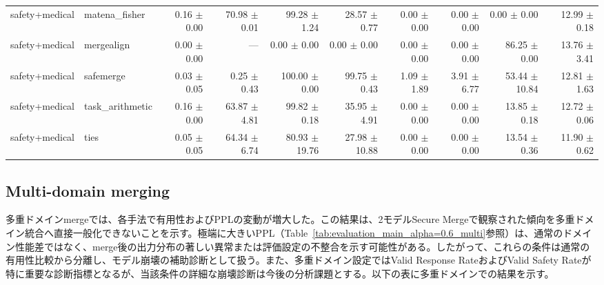 \documentclass{article}
\begin{document}
\begin{table}[H]
{\begin{tabular}{llrrrrrrrr}
safety+medical & matena\_fisher & 0.16 $\pm$ 0.00 & 70.98 $\pm$ 0.01 & 99.28 $\pm$ 1.24 & 28.57 $\pm$ 0.77 & 0.00 $\pm$ 0.00 & 0.00 $\pm$ 0.00 & 0.00 $\pm$ 0.00 & 12.99 $\pm$ 0.18 \\
safety+medical & mergealign & 0.00 $\pm$ 0.00 & --- & 0.00 $\pm$ 0.00 & 0.00 $\pm$ 0.00 & 0.00 $\pm$ 0.00 & 0.00 $\pm$ 0.00 & 86.25 $\pm$ 0.00 & 13.76 $\pm$ 3.41 \\
safety+medical & safemerge & 0.03 $\pm$ 0.05 & 0.25 $\pm$ 0.43 & 100.00 $\pm$ 0.00 & 99.75 $\pm$ 0.43 & 1.09 $\pm$ 1.89 & 3.91 $\pm$ 6.77 & 53.44 $\pm$ 10.84 & 12.81 $\pm$ 1.63 \\
safety+medical & task\_arithmetic & 0.16 $\pm$ 0.00 & 63.87 $\pm$ 4.81 & 99.82 $\pm$ 0.18 & 35.95 $\pm$ 4.91 & 0.00 $\pm$ 0.00 & 0.00 $\pm$ 0.00 & 13.85 $\pm$ 0.18 & 12.72 $\pm$ 0.06 \\
safety+medical & ties & 0.05 $\pm$ 0.05 & 64.34 $\pm$ 6.74 & 80.93 $\pm$ 19.76 & 27.98 $\pm$ 10.88 & 0.00 $\pm$ 0.00 & 0.00 $\pm$ 0.00 & 13.54 $\pm$ 0.36 & 11.90 $\pm$ 0.62 \\
\bottomrule
\end{tabular}
}
\end{table}

\subsection{Multi-domain merging}
多重ドメインmergeでは、各手法で有用性およびPPLの変動が増大した。この結果は、2モデルSecure Mergeで観察された傾向を多重ドメイン統合へ直接一般化できないことを示す。極端に大きいPPL（Table~\ref{tab:evaluation_main_alpha=0.6_multi}参照）は、通常のドメイン性能差ではなく、merge後の出力分布の著しい異常または評価設定の不整合を示す可能性がある。したがって、これらの条件は通常の有用性比較から分離し、モデル崩壊の補助診断として扱う。また、多重ドメイン設定ではValid Response RateおよびValid Safety Rateが特に重要な診断指標となるが、当該条件の詳細な崩壊診断は今後の分析課題とする。以下の表に多重ドメインでの結果を示す。
\end{document}
